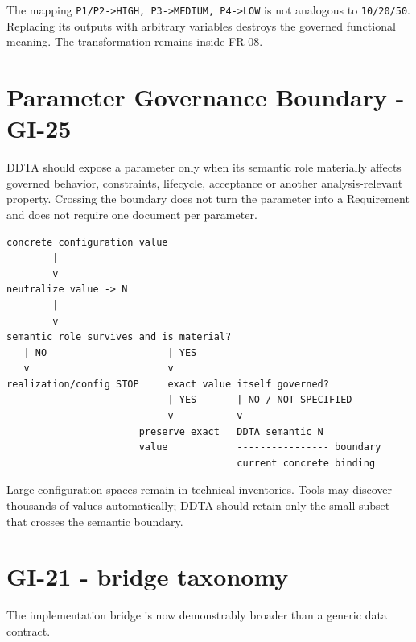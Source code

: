 \documentclass[11pt,a4paper]{article}
\begin{document}
\begin{ddtaanti}[title={Do not parameterize away governed transformations}]
The mapping \texttt{P1/P2->HIGH, P3->MEDIUM, P4->LOW} is not analogous to \texttt{10/20/50}. Replacing its outputs with arbitrary variables destroys the governed functional meaning. The transformation remains inside FR-08.
\end{ddtaanti}

\section{Parameter Governance Boundary - GI-25}
\begin{ddtacore}[title={High-confidence candidate}]
DDTA should expose a parameter only when its semantic role materially affects governed behavior, constraints, lifecycle, acceptance or another analysis-relevant property. Crossing the boundary does not turn the parameter into a Requirement and does not require one document per parameter.
\end{ddtacore}

\begin{lstlisting}
concrete configuration value
        |
        v
neutralize value -> N
        |
        v
semantic role survives and is material?
   | NO                     | YES
   v                        v
realization/config STOP     exact value itself governed?
                            | YES       | NO / NOT SPECIFIED
                            v           v
                       preserve exact   DDTA semantic N
                       value            ---------------- boundary
                                        current concrete binding
\end{lstlisting}

Large configuration spaces remain in technical inventories. Tools may discover thousands of values automatically; DDTA should retain only the small subset that crosses the semantic boundary.

\section{GI-21 - bridge taxonomy}
The implementation bridge is now demonstrably broader than a generic data contract.
\end{document}
